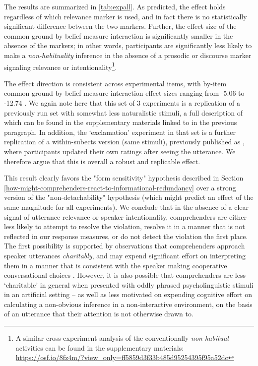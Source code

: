 \documentclass{sp}\usepackage[]{graphicx}\usepackage[]{color}
\begin{document}
The results are summarized in \ref{tab:expall}.  As predicted, the effect holds regardless of which relevance marker is used, and in fact there is no statistically significant difference between the two markers.  Further, the effect size of the common ground by belief measure interaction is significantly smaller in the absence of the markers; in other words, participants are significantly less likely to make a \textit{non-habituality} inference in the absence of a prosodic or discourse marker signaling relevance or intentionality\footnote{A similar cross-experiment analysis of the conventionally \textit{non-habitual} activities can be found in the supplementary materials: \url{https://osf.io/8fz4m/?view_only=ff5859d3f33b485d95254395f95a52dc}}.

The effect direction is consistent across experimental items, with by-item common ground by belief measure interaction effect sizes ranging from %
-5.06
 to %
-12.74
.  We again note here that this set of 3 experiments is a replication of a previously run set with somewhat less naturalistic stimuli, a full description of which can be found in the supplementary materials linked to in the previous paragraph. In addition, the `exclamation' experiment in that set is a further replication of a within-subects version (same stimuli), previously published as \citet{Kravtchenko2015}, where participants updated their own ratings after seeing the utterance.  We therefore argue that this is overall a robust and replicable effect.

This result clearly favors the "form sensitivity" hypothesis described in Section \ref{how-might-comprehenders-react-to-informational-redundancy} over a strong version of the "non-detachability" hypothesis (which might predict an effect of the same magnitude for all experiments).  We conclude that in the absence of a clear signal of utterance relevance or speaker intentionality, comprehenders are either less likely to attempt to resolve the violation, resolve it in a manner that is not reflected in our response measures, or do not detect the violation the first place. The first possibility is supported by observations that comprehenders approach speaker utterances \textit{charitably}, and may expend significant effort on interpreting them in a manner that is consistent with the speaker making cooperative conversational choices \citep{Davidson1974}. However, it is also possible that comprehenders are less `charitable' in general when presented with oddly phrased psycholinguistic stimuli in an artificial setting -- as well as less motivated on expending cognitive effort on calculating a non-obvious inference in a non-interactive environment, on the basis of an utterance that their attention is not otherwise drawn to.
\end{document}
